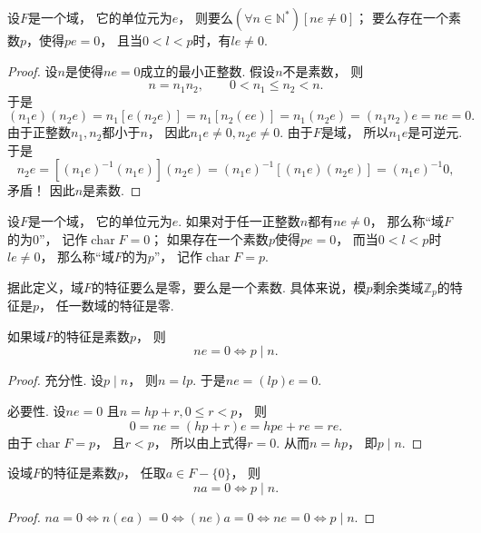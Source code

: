 \begin{theorem}
设\(F\)是一个域，
它的单位元为\(e\)，
则要么\((\forall n\in\mathbb{N}^*)[ne\neq0]\)；
要么存在一个素数\(p\)，使得\(pe=0\)，
且当\(0<l<p\)时，有\(le\neq0\).
\begin{proof}
设\(n\)是使得\(ne=0\)成立的最小正整数.
假设\(n\)不是素数，
则\[
	n=n_1 n_2,
	\qquad
	0<n_1 \leq n_2<n.
\]
于是%
\[
	(n_1 e)(n_2 e)
	=n_1[e(n_2 e)]
	=n_1[n_2(ee)]
	=n_1(n_2 e)
	=(n_1 n_2)e
	=ne=0.
\]
由于正整数\(n_1,n_2\)都小于\(n\)，
因此\(n_1 e\neq0,
n_2 e\neq0\).
由于\(F\)是域，
所以\(n_1 e\)是可逆元.
于是\[
	n_2 e
	=[(n_1 e)^{-1} (n_1 e)](n_2 e)
	=(n_1 e)^{-1}
	[(n_1 e)(n_2 e)]
	=(n_1 e)^{-1} 0,
\]
矛盾！
因此\(n\)是素数.
\end{proof}
\end{theorem}

\def\FieldChar{\operatorname{char}}%
\begin{definition}
设\(F\)是一个域，
它的单位元为\(e\).
如果对于任一正整数\(n\)都有\(ne\neq0\)，
那么称“域\(F\)的为0”，
记作\(\FieldChar F=0\)；
如果存在一个素数\(p\)使得\(pe=0\)，
而当\(0<l<p\)时\(le\neq0\)，
那么称“域\(F\)的为\(p\)”，
记作\(\FieldChar F=p\).
\end{definition}

据此定义，域\(F\)的特征要么是零，要么是一个素数.
具体来说，模\(p\)剩余类域\(\mathbb{Z}_p\)的特征是\(p\)，
任一数域的特征是零.

\begin{corollary}
如果域\(F\)的特征是素数\(p\)，
则\[
	ne=0
	\iff
	p \mid n.
\]
\begin{proof}
充分性.
设\(p \mid n\)，
则\(n=lp\).
于是\(ne
=(lp)e
=0\).

必要性.
设\(ne=0\)
且\(n=hp+r,0\leq r<p\)，
则\[
	0=ne
	=(hp+r)e
	=hpe+re
	=re.
\]
由于\(\FieldChar F=p\)，
且\(r<p\)，
所以由上式得\(r=0\).
从而\(n=hp\)，
即\(p \mid n\).
\end{proof}
\end{corollary}

\begin{corollary}
设域\(F\)的特征是素数\(p\)，
任取\(a \in F-\{0\}\)，
则\[
	na=0
	\iff
	p \mid n.
\]
\begin{proof}
\(na=0
\iff
n(ea)=0
\iff
(ne)a=0
\iff
ne=0
\iff
p \mid n\).
\end{proof}
\end{corollary}

